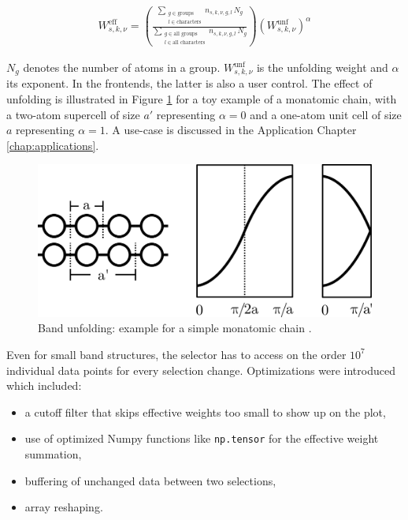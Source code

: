 \begin{align}
  W^{\text{eff}}_{s,k,\nu} = \left( \frac{\sum\limits_{\substack{g \in \text{groups} \\ l \in \text{characters}}} n_{s,k,\nu,g,l}\, N_g}{\sum\limits_{\substack{g \in \text{all groups} \\ l \in \text{all characters}}} n_{s,k,\nu,g,l}\, N_g} \right) \left(W_{s,k,\nu}^{\text{unf}}\right)^\alpha
\label{eq:effective-weight}
\end{align}

\(N_g\) denotes the number of atoms in a group. \(W_{s,k,\nu}^{\text{unf}}\) is
the unfolding weight and \(\alpha\) its exponent. In the frontends, the latter
is also a user control. The effect of unfolding is illustrated in Figure
\ref{fig:unfolding} for a toy example of a monatomic chain, with a two-atom
supercell of size \(a'\) representing \(\alpha=0\) and a one-atom unit cell of
size \(a\) representing \(\alpha=1\). A use-case is discussed in the Application
Chapter \ref{chap:applications}.

\begin{figure}[htb!]
    \centering
    \includegraphics[width=0.6\linewidth]{fig/unfolding.png}
    \caption[Band Unfolding]{Band unfolding: example for a simple monatomic
      chain \cite{hoffmann1987chemistry}.}
    \label{fig:unfolding}
\end{figure}

Even for small band structures, the selector has to access on the order \(10^7\)
individual data points for every selection change. Optimizations were introduced
which included:
\begin{itemize}
\item a cutoff filter that skips effective weights too small to show up on the
    plot,
\item use of optimized Numpy functions like \texttt{np.tensor} for the
    effective weight summation,
\item buffering of unchanged data between two selections,
\item array reshaping.
\end{itemize}

